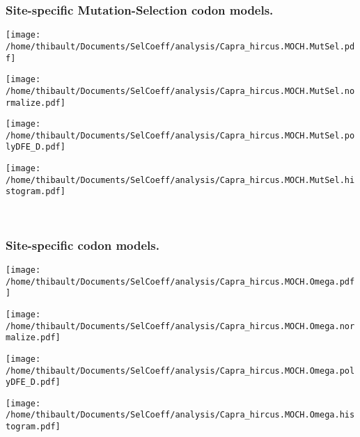 \subsubsection*{Site-specific Mutation-Selection codon models.} 
\begin{minipage}{0.49\linewidth} 
\texttt{[image: /home/thibault/Documents/SelCoeff/analysis/Capra\_hircus.MOCH.MutSel.pdf]} 
\end{minipage}
\begin{minipage}{0.49\linewidth} 
\texttt{[image: /home/thibault/Documents/SelCoeff/analysis/Capra\_hircus.MOCH.MutSel.normalize.pdf]} 
\end{minipage}
\begin{minipage}{0.49\linewidth} 
\texttt{[image: /home/thibault/Documents/SelCoeff/analysis/Capra\_hircus.MOCH.MutSel.polyDFE\_D.pdf]} 
\end{minipage}
\begin{minipage}{0.49\linewidth} 
\texttt{[image: /home/thibault/Documents/SelCoeff/analysis/Capra\_hircus.MOCH.MutSel.histogram.pdf]} 
\end{minipage}
\\ 
\subsubsection*{Site-specific codon models.} 
\begin{minipage}{0.49\linewidth} 
\texttt{[image: /home/thibault/Documents/SelCoeff/analysis/Capra\_hircus.MOCH.Omega.pdf]} 
\end{minipage}
\begin{minipage}{0.49\linewidth} 
\texttt{[image: /home/thibault/Documents/SelCoeff/analysis/Capra\_hircus.MOCH.Omega.normalize.pdf]} 
\end{minipage}
\begin{minipage}{0.49\linewidth} 
\texttt{[image: /home/thibault/Documents/SelCoeff/analysis/Capra\_hircus.MOCH.Omega.polyDFE\_D.pdf]} 
\end{minipage}
\begin{minipage}{0.49\linewidth} 
\texttt{[image: /home/thibault/Documents/SelCoeff/analysis/Capra\_hircus.MOCH.Omega.histogram.pdf]} 
\end{minipage}
\\ 
